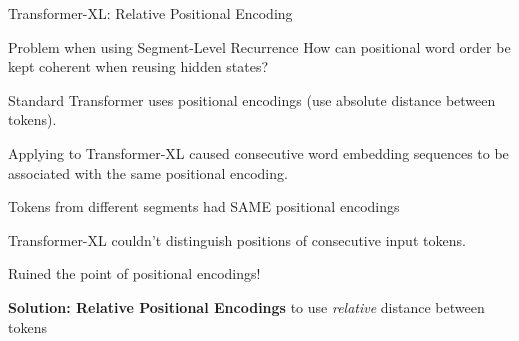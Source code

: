 \begin{frame}{Transformer-XL: Relative Positional Encoding}
    \vspace{20pt}
    
    \begin{alertBlock}{Problem when using Segment-Level Recurrence}
        \footnotesize 
        How can \alert{positional word order be kept coherent when reusing hidden states?}\newline 
        
        Standard Transformer uses positional encodings (use absolute distance between tokens). \newline 
    
        \begin{addmargin}{3em}{} %
        \begin{itemizeSpaced}{5pt}
            \largearrowitem Applying to Transformer-XL caused consecutive word embedding sequences to be associated with the same positional encoding.
            
            \largearrowitem Tokens from different segments had SAME positional encodings
            
            \largearrowitem Transformer-XL couldn't distinguish positions of consecutive input tokens.
            
            \largearrowitem Ruined the point of positional encodings!
            
        \end{itemizeSpaced}
        \end{addmargin} 
        
        
    \end{alertBlock} 
    
    
    \begin{itemizeSpaced}{0pt}
        \item {\color{ForestGreen} \textbf{Solution: Relative Positional Encodings}} to use \emph{relative} distance between tokens 
    \end{itemizeSpaced}

    
\end{frame}



